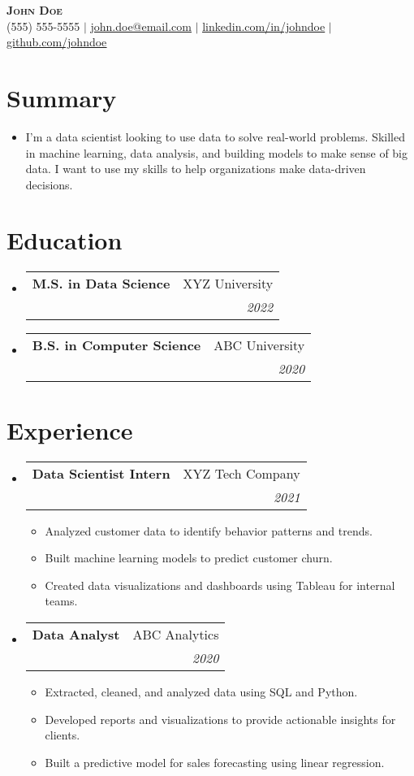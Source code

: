 \documentclass[letterpaper,11pt]{article}
\makeatletter
\newcommand{\resumeItem}[1]{
  \item\small{
    {#1 \vspace{-2pt}}
  }
}
\newcommand{\resumeSubheading}[4]{
  \vspace{-2pt}\item
    \begin{tabular*}{0.97\textwidth}[t]{l@{\extracolsep{\fill}}r}
      \textbf{#1} & #2 \\
      \textit{\small#3} & \textit{\small #4} \\
    \end{tabular*}\vspace{-7pt}
}
\newcommand{\resumeSubHeadingListStart}{\begin{itemize}[leftmargin=0.15in, label={}]}
\newcommand{\resumeSubHeadingListEnd}{\end{itemize}}
\newcommand{\resumeItemListStart}{\begin{itemize}}
\newcommand{\resumeItemListEnd}{\end{itemize}\vspace{-5pt}}
\makeatother
\begin{document}
\begin{center}
    \textbf{\Huge \scshape John Doe} \\ \vspace{1pt}
    \small (555) 555-5555 $|$ \href{mailto:john.doe@email.com}{\underline{john.doe@email.com}} $|$ 
    \href{linkedin.com/in/johndoe}{\underline{linkedin.com/in/johndoe}} $|$
    \href{github.com/johndoe}{\underline{github.com/johndoe}}
\end{center}


\section{Summary}
\begin{itemize}[leftmargin=0.15in, label={}]
    \item \small{I’m a data scientist looking to use data to solve real-world problems. Skilled in machine learning, data analysis, and building models to make sense of big data. I want to use my skills to help organizations make data-driven decisions.}
\end{itemize}


\section{Education}
  \resumeSubHeadingListStart
    \resumeSubheading
      {M.S. in Data Science}{XYZ University}
      {}{2022}
    \resumeSubheading
      {B.S. in Computer Science}{ABC University}
      {}{2020}
  \resumeSubHeadingListEnd


\section{Experience}
  \resumeSubHeadingListStart
    \resumeSubheading
      {Data Scientist Intern}{XYZ Tech Company}
      {}{2021}
      \resumeItemListStart
        \resumeItem{Analyzed customer data to identify behavior patterns and trends.}
        \resumeItem{Built machine learning models to predict customer churn.}
        \resumeItem{Created data visualizations and dashboards using Tableau for internal teams.}
      \resumeItemListEnd
    \resumeSubheading
      {Data Analyst}{ABC Analytics}
      {}{2020}
      \resumeItemListStart
        \resumeItem{Extracted, cleaned, and analyzed data using SQL and Python.}
        \resumeItem{Developed reports and visualizations to provide actionable insights for clients.}
        \resumeItem{Built a predictive model for sales forecasting using linear regression.}
      \resumeItemListEnd
  \resumeSubHeadingListEnd
\end{document}

